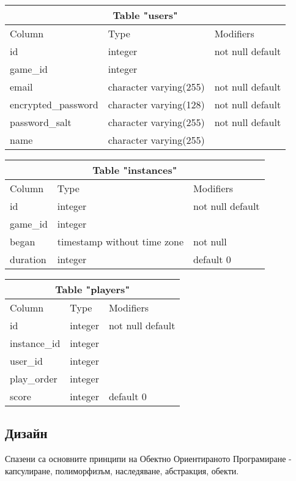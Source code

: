 \documentclass[a4paper]{article}
\begin{document}
\vspace{10 pt}

\begin{tabular} { | l | l | l | }
\multicolumn{3}{c}{Table "users"} \\
\hline
Column & Type & Modifiers \\
\hline
id & integer & not null default \\
game\_id & integer & \\
email & character varying(255) & not null default \\
encrypted\_password & character varying(128) & not null default \\
password\_salt & character varying(255) & not null default \\
name & character varying(255) & \\ 
\hline
\end{tabular}

\vspace{10 pt}

\begin{tabular} { | l | l | l | }
\multicolumn{3}{c}{Table "instances"} \\
\hline
Column & Type & Modifiers \\
\hline
id & integer & not null default \\
game\_id  & integer                     & \\
began    & timestamp without time zone & not null \\
duration & integer                     & default 0 \\
\hline
\end{tabular}

\begin{tabular} { | l | l | l | }
\multicolumn{3}{c}{Table "players"} \\
\hline
Column & Type & Modifiers \\
\hline
id & integer & not null default \\
instance\_id & integer & \\
user\_id     & integer & \\
play\_order  & integer & \\
score       & integer & default 0 \\
\hline
\end{tabular}

\subsection{Дизайн} 
Спазени са основните принципи на Обектно Ориентираното Програмиране \cite{oop} - капсулиране, полиморфизъм, наследяване, абстракция, обекти.
\end{document}
